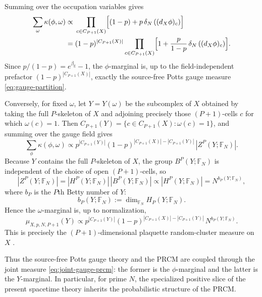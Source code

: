 Summing over the occupation variables gives
\begin{equation}
\begin{aligned}
	\sum_{\omega}\kappa(\phi,\omega)
	\propto&\;
	\prod_{c\in C_{P+1}(X)}
	\Bigl[(1-p)+p\,\delta_N\left((d_X\phi)_c\right)\Bigr]
	\\=&\;
	(1-p)^{|C_{P+1}(X)|}
	\prod_{c\in C_{P+1}(X)}
	\Bigl[
	1+\frac{p}{1-p}\,\delta_N\left((d_X\phi)_c\right)
	\Bigr].
\end{aligned}
\end{equation}
Since \(p/(1-p)=e^{\beta_{\mathrm g}}-1\), the \(\phi\)-marginal is, up to the
field-independent prefactor \((1-p)^{|C_{P+1}(X)|}\), exactly the source-free
Potts gauge measure \eqref{eq:gauge-partition}.

Conversely, for fixed \(\omega\), let \(Y=Y(\omega)\) be the subcomplex of \(X\)
obtained by taking the full \(P\)-skeleton of \(X\) and adjoining precisely
those \((P+1)\)-cells \(c\) for which \(\omega(c)=1\). Then
\(C_{P+1}(Y)=\{c\in C_{P+1}(X):\omega(c)=1\}\), and summing over the gauge field
gives
\begin{equation}
	\sum_{\phi}\kappa(\phi,\omega)
	\propto
	p^{|C_{P+1}(Y)|}(1-p)^{|C_{P+1}(X)|-|C_{P+1}(Y)|}\,
	|Z^P(Y;\mathbb F_N)|.
\end{equation}
Because \(Y\) contains the full \(P\)-skeleton of \(X\), the group
\(B^P(Y;\mathbb F_N)\) is independent of the choice of open \((P+1)\)-cells, so
\begin{equation}
	|Z^P(Y;\mathbb F_N)|
	=
	|H^P(Y;\mathbb F_N)|\,|B^P(Y;\mathbb F_N)|
	\propto
	|H^P(Y;\mathbb F_N)|
	=
	N^{b_P(Y;\mathbb F_N)},
\end{equation}
where $b_P$ is the $P$th Betty number of $Y$:
\begin{equation}
	b_P(Y;\mathbb F_N):=\dim_{\mathbb F_N}H_P(Y;\mathbb F_N).
\end{equation}
Hence the \(\omega\)-marginal is, up to normalization,
\begin{equation}
	\mu_{X,p,N,P+1}(Y)
	\propto
	p^{|C_{P+1}(Y)|}(1-p)^{|C_{P+1}(X)|-|C_{P+1}(Y)|}\,
	N^{b_P(Y;\mathbb F_N)}.
	\label{eq:prcm-measure}
\end{equation}
This is precisely the \((P+1)\)-dimensional plaquette random-cluster measure on
\(X\) \cite{HiraokaShirai2016}.

Thus the source-free Potts gauge theory and the PRCM
are coupled through the joint measure \eqref{eq:joint-gauge-prcm}: the former
is the \(\phi\)-marginal and the latter is the \(Y\)-marginal. In particular,
for prime \(N\), the specialized positive slice of the present spacetime theory
inherits the probabilistic structure of the PRCM.







